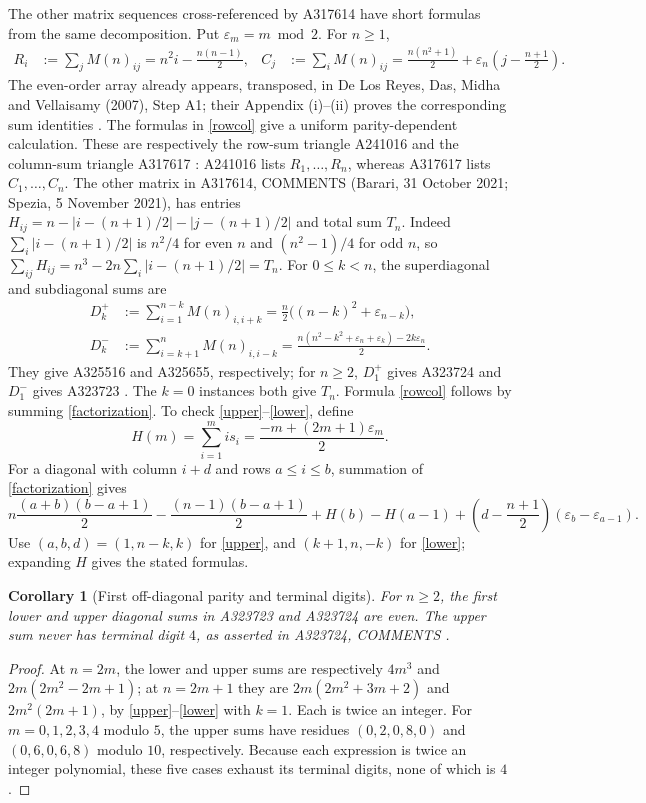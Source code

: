 \documentclass[11pt]{article}
\newtheorem{corollary}[theorem]{Corollary}
\newcommand{\eps}{\varepsilon}
\begin{document}
The other matrix sequences cross-referenced by A317614 have short formulas
from the same decomposition. Put $\eps_m=m\bmod2$. For $n\geq1$,
\begin{align}
 R_i&:=\sum_j M(n)_{ij}=n^2i-\frac{n(n-1)}2,
 &C_j&:=\sum_i M(n)_{ij}=\frac{n(n^2+1)}2+
 \eps_n\left(j-\frac{n+1}2\right).\label{rowcol}
\end{align}
The even-order array already appears, transposed, in De Los Reyes,
Das, Midha and Vellaisamy (2007), Step A1; their Appendix (i)--(ii)
proves the corresponding sum identities \cite{rectangles}.
The formulas in \eqref{rowcol} give a uniform parity-dependent calculation.
These are respectively the row-sum triangle A241016 and the column-sum
triangle A317617 \cite{sums}: A241016 lists $R_1,\ldots,R_n$, whereas A317617 lists
$C_1,\ldots,C_n$.
The other matrix in A317614, COMMENTS (Barari, 31 October 2021;
Spezia, 5 November 2021), has entries
$H_{ij}=n-|i-(n+1)/2|-|j-(n+1)/2|$ and total sum $T_n$.
Indeed $\sum_i|i-(n+1)/2|$ is $n^2/4$ for even $n$ and $(n^2-1)/4$
for odd $n$, so $\sum_{ij}H_{ij}=n^3-2n\sum_i|i-(n+1)/2|=T_n$.
For $0\leq k<n$, the superdiagonal and subdiagonal sums are
\begin{align}
 D_k^+&:=\sum_{i=1}^{n-k}M(n)_{i,i+k}
       =\frac n2\big((n-k)^2+\eps_{n-k}\big),\label{upper}\\
 D_k^-&:=\sum_{i=k+1}^{n}M(n)_{i,i-k}
       =\frac{n(n^2-k^2+\eps_n+\eps_k)-2k\eps_n}{2}.\label{lower}
\end{align}
They give A325516 and A325655, respectively; for $n\geq2$, $D_1^+$ gives A323724 and
$D_1^-$ gives A323723 \cite{diagonals}. The $k=0$ instances both
give $T_n$. Formula \eqref{rowcol} follows by summing
\eqref{factorization}. To check \eqref{upper}--\eqref{lower}, define
\[
 H(m)=\sum_{i=1}^m i s_i=\frac{-m+(2m+1)\eps_m}{2}.
\]
For a diagonal with column $i+d$ and rows $a\leq i\leq b$, summation
of \eqref{factorization} gives
\begin{equation}\label{diagonalproof}
 n\frac{(a+b)(b-a+1)}2-\frac{(n-1)(b-a+1)}2
 +H(b)-H(a-1)+\left(d-\frac{n+1}2\right)(\eps_b-\eps_{a-1}).
\end{equation}
Use $(a,b,d)=(1,n-k,k)$ for \eqref{upper}, and
$(k+1,n,-k)$ for \eqref{lower}; expanding $H$ gives the stated formulas.

\begin{corollary}[First off-diagonal parity and terminal digits]\label{lastdigits}
For $n\geq2$, the first lower and upper diagonal sums in A323723 and A323724 are even.
The upper sum never has terminal digit $4$, as asserted in A323724,
COMMENTS \cite{diagonals}.
\end{corollary}
\begin{proof}
At $n=2m$, the lower and upper sums are respectively
$4m^3$ and $2m(2m^2-2m+1)$; at $n=2m+1$ they are
$2m(2m^2+3m+2)$ and $2m^2(2m+1)$, by \eqref{upper}--\eqref{lower}
with $k=1$. Each is twice an integer. For $m=0,1,2,3,4$ modulo $5$,
the upper sums have residues $(0,2,0,8,0)$ and $(0,6,0,6,8)$ modulo $10$,
respectively. Because each expression is twice an integer polynomial,
these five cases exhaust its terminal digits, none of which is $4$.
\end{proof}
\end{document}
